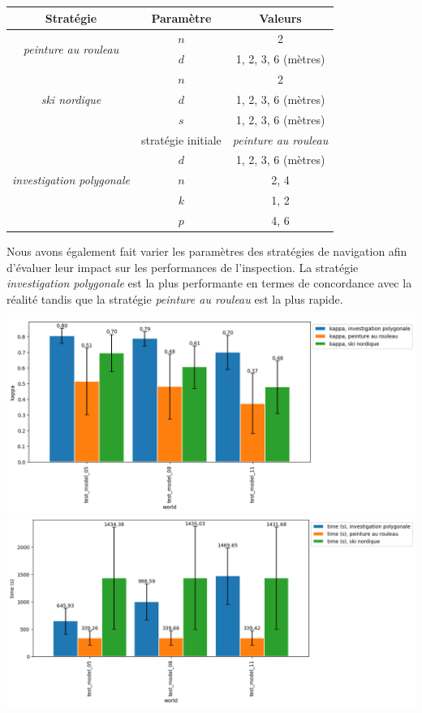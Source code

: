 \documentclass[a0paper,portrait]{baposter}
\begin{document}
\begin{poster}
{			\begin{tabular}{|c|c|c|}
				\hline
				Stratégie & Paramètre & Valeurs \\
				\hline
				\multirow{2}{*}{\textit{peinture au rouleau}} & $n$ & 2 \\
				& $d$ & 1, 2, 3, 6 (mètres) \\
				\hline
				\multirow{3}{*}{\textit{ski nordique}} & $n$ & 2 \\
				& $d$ & 1, 2, 3, 6 (mètres) \\
				& $s$ & 1, 2, 3, 6 (mètres) \\
				\hline
				\multirow{5}{*}{\textit{investigation polygonale}} & stratégie initiale & \textit{peinture au rouleau} \\
				& $d$ & 1, 2, 3, 6 (mètres) \\
				& $n$ & 2, 4 \\
				& $k$ & 1, 2 \\
				& $p$ & 4, 6 \\
				\hline
			\end{tabular}

			\vspace{15pt}

			Nous avons également fait varier les paramètres des stratégies de navigation afin d'évaluer leur impact sur les performances de l'inspection.
			La stratégie \textit{investigation polygonale} est la plus performante en termes de concordance avec la réalité tandis que la stratégie \textit{peinture au rouleau} est la plus rapide.

			\vspace{5pt}

			\includegraphics[width=0.5\linewidth]{graphics/investigation_polygonale-peinture_au_rouleau_ski_nordique-kappa_for_each_world_vs_investigation_polygonale-kappa_for_each_world.png}
			\includegraphics[width=0.5\linewidth]{graphics/investigation_polygonale-peinture_au_rouleau_ski_nordique-time_for_each_world_vs_investigation_polygonale-time_for_each_world.png}
		}
\end{poster}
\end{document}
